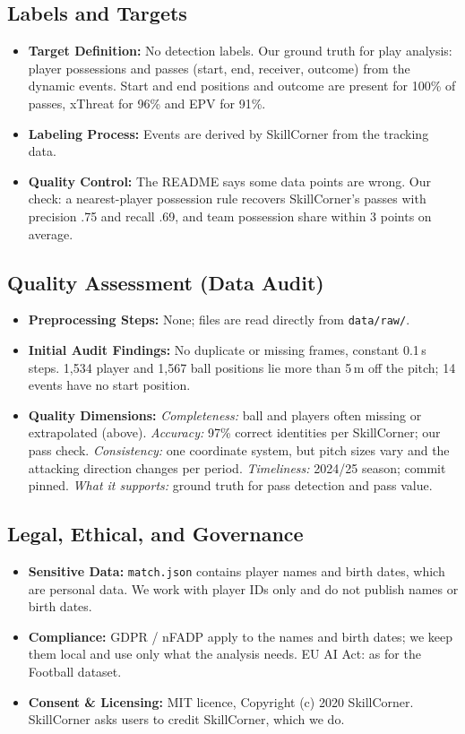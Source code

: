 \documentclass[11pt, a4paper]{article}
\begin{document}
\subsection{Labels and Targets}
\begin{itemize}
    \item \textbf{Target Definition:} No detection labels. Our ground truth for play analysis: player possessions and passes (start, end, receiver, outcome) from the dynamic events. Start and end positions and outcome are present for 100\% of passes, xThreat for 96\% and EPV for 91\%.
    \item \textbf{Labeling Process:} Events are derived by SkillCorner from the tracking data.
    \item \textbf{Quality Control:} The README says some data points are wrong. Our check: a nearest-player possession rule recovers SkillCorner's passes with precision .75 and recall .69, and team possession share within 3 points on average.
\end{itemize}

\subsection{Quality Assessment (Data Audit)}
\begin{itemize}
    \item \textbf{Preprocessing Steps:} None; files are read directly from \texttt{data/raw/}.
    \item \textbf{Initial Audit Findings:} No duplicate or missing frames, constant 0.1\,s steps. 1,534 player and 1,567 ball positions lie more than 5\,m off the pitch; 14 events have no start position.
    \item \textbf{Quality Dimensions:} \emph{Completeness:} ball and players often missing or extrapolated (above). \emph{Accuracy:} 97\% correct identities per SkillCorner; our pass check. \emph{Consistency:} one coordinate system, but pitch sizes vary and the attacking direction changes per period. \emph{Timeliness:} 2024/25 season; commit pinned. \emph{What it supports:} ground truth for pass detection and pass value.
\end{itemize}

\subsection{Legal, Ethical, and Governance}
\begin{itemize}
    \item \textbf{Sensitive Data:} \texttt{match.json} contains player names and birth dates, which are personal data. We work with player IDs only and do not publish names or birth dates.
    \item \textbf{Compliance:} GDPR / nFADP apply to the names and birth dates; we keep them local and use only what the analysis needs. EU AI Act: as for the Football dataset.
    \item \textbf{Consent \& Licensing:} MIT licence, Copyright (c) 2020 SkillCorner. SkillCorner asks users to credit SkillCorner, which we do.
\end{itemize}
\end{document}
